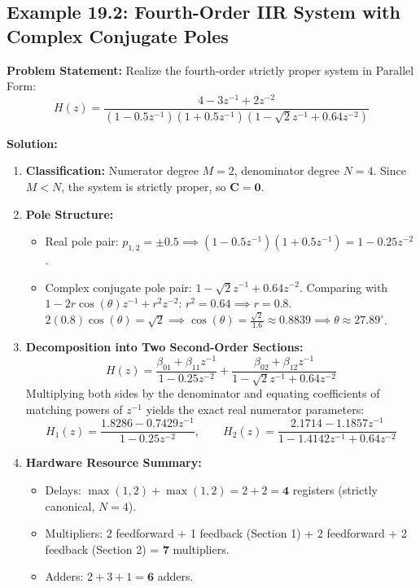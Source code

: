 \documentclass[11pt,a4paper]{article}
\begin{document}
\vspace{0.4cm}
\subsection{Example 19.2: Fourth-Order IIR System with Complex Conjugate Poles}
\textbf{Problem Statement:} Realize the fourth-order strictly proper system in Parallel Form:
\begin{equation}
H(z) = \frac{4 - 3 z^{-1} + 2 z^{-2}}{(1 - 0.5 z^{-1})(1 + 0.5 z^{-1})(1 - \sqrt{2} z^{-1} + 0.64 z^{-2})}
\end{equation}

\noindent\textbf{Solution:}
\begin{enumerate}
    \item \textbf{Classification:}
    Numerator degree $M = 2$, denominator degree $N = 4$.
    Since $M < N$, the system is strictly proper, so $\mathbf{C = 0}$.
    
    \item \textbf{Pole Structure:}
    \begin{itemize}
        \item Real pole pair: $p_{1,2} = \pm 0.5 \implies (1 - 0.5 z^{-1})(1 + 0.5 z^{-1}) = 1 - 0.25 z^{-2}$.
        \item Complex conjugate pole pair: $1 - \sqrt{2} z^{-1} + 0.64 z^{-2}$.
        Comparing with $1 - 2r\cos(\theta) z^{-1} + r^2 z^{-2}$:
        $r^2 = 0.64 \implies r = 0.8$.
        $2(0.8)\cos(\theta) = \sqrt{2} \implies \cos(\theta) = \frac{\sqrt{2}}{1.6} \approx 0.8839 \implies \theta \approx 27.89^\circ$.
    \end{itemize}
    
    \item \textbf{Decomposition into Two Second-Order Sections:}
    \begin{equation}
    H(z) = \frac{\beta_{01} + \beta_{11} z^{-1}}{1 - 0.25 z^{-2}} + \frac{\beta_{02} + \beta_{12} z^{-1}}{1 - \sqrt{2} z^{-1} + 0.64 z^{-2}}
    \end{equation}
    Multiplying both sides by the denominator and equating coefficients of matching powers of $z^{-1}$ yields the exact real numerator parameters:
    \begin{equation}
    H_1(z) = \frac{1.8286 - 0.7429 z^{-1}}{1 - 0.25 z^{-2}}, \qquad H_2(z) = \frac{2.1714 - 1.1857 z^{-1}}{1 - 1.4142 z^{-1} + 0.64 z^{-2}}
    \end{equation}
    
    \item \textbf{Hardware Resource Summary:}
    \begin{itemize}
        \item Delays: $\max(1, 2) + \max(1, 2) = 2 + 2 = \mathbf{4}$ registers (strictly canonical, $N=4$).
        \item Multipliers: 2 feedforward + 1 feedback (Section 1) + 2 feedforward + 2 feedback (Section 2) = $\mathbf{7}$ multipliers.
        \item Adders: $2 + 3 + 1 = \mathbf{6}$ adders.
    \end{itemize}
\end{enumerate}
\end{document}
